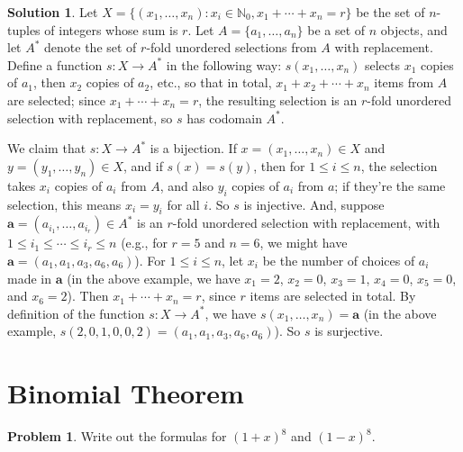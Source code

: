 \documentclass{article}
\numberwithin{equation}{section}
\theoremstyle{plain}
\theoremstyle{definition}
\newtheorem{problem}{Problem}
\newtheorem*{solution*}{Solution}
\newcommand{\N}{\mathbb N}
\begin{document}
\begin{solution*}
	Let $X = \{(x_1, \ldots, x_n) : x_i \in \N_0, x_1 + \cdots + x_n = r\}$ be the set of $n$-tuples of integers whose sum is $r$. Let $A = \{a_1, \ldots, a_n\}$ be a set of $n$ objects, and let $A^*$ denote the set of $r$-fold unordered selections from $A$ with replacement. Define a function $s : X \to A^*$ in the following way: $s(x_1, \ldots, x_n)$ selects $x_1$ copies of $a_1$, then $x_2$ copies of $a_2$, etc., so that in total, $x_1 + x_2 + \cdots + x_n$ items from $A$ are selected; since $x_1 + \cdots + x_n = r$, the resulting selection is an $r$-fold unordered selection with replacement, so $s$ has codomain $A^*$. 
	
	We claim that $s : X \to A^*$ is a bijection. If $x = (x_1, \ldots, x_n) \in X$ and $y = (y_1, \ldots, y_n) \in X$, and if $s(x) = s(y)$, then for $1 \leq i \leq n$, the selection takes $x_i$ copies of $a_i$ from $A$, and also $y_i$ copies of $a_i$ from $a$; if they're the same selection, this means $x_i = y_i$ for all $i$. So $s$ is injective. And, suppose $\mathbf{a} = (a_{i_1}, \ldots, a_{i_r}) \in A^*$ is an $r$-fold unordered selection with replacement, with $1 \leq i_1 \leq \cdots \leq i_r \leq n$ (e.g., for $r=5$ and $n=6$, we might have $\mathbf a = (a_1, a_1, a_3, a_6, a_6)$). For $1 \leq i \leq n$, let $x_i$ be the number of choices of $a_i$ made in $\mathbf a$ (in the above example, we have $x_1 = 2$, $x_2 = 0$, $x_3 = 1$, $x_4 = 0$, $x_5 = 0$, and $x_6 = 2$). Then $x_1 + \cdots + x_n = r$, since $r$ items are selected in total. By definition of the function $s : X \to A^*$, we have $s(x_1, \ldots, x_n) = \mathbf a$ (in the above example, $s(2,0,1,0,0,2) = (a_1, a_1, a_3, a_6, a_6)$). So $s$ is surjective. 
\end{solution*}

\section*{Binomial Theorem}

\begin{problem}
	Write out the formulas for $(1+x)^8$ and $(1-x)^8$. 
\end{problem}
\end{document}
